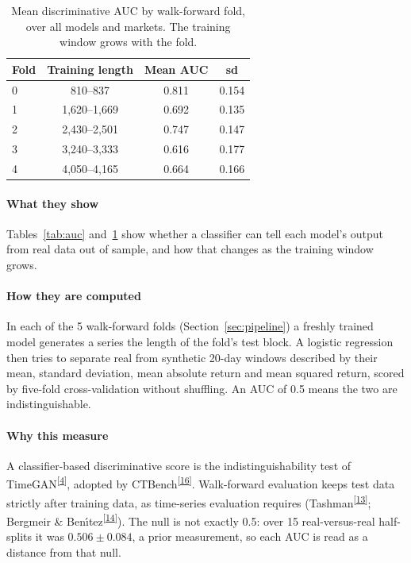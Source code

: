 \documentclass[11pt,a4paper]{article}
\makeatletter
\newcommand{\tcite}[1]{\textsuperscript{[\hyperlink{R:#1}{#1}]}}
\DeclareRobustCommand{\_}{\ifmmode\nfss@text{\textunderscore}\else\textunderscore\allowbreak\fi}
\makeatother
\begin{document}
\begin{table}[htbp]
\centering
\caption{Mean discriminative AUC by walk-forward fold, over all models and markets. The training window grows with the fold.}
\label{tab:folds}
\begin{tabular}{@{}lccc@{}}
\toprule
Fold & Training length & Mean AUC & sd \\
\midrule
0 & 810--837 & 0.811 & 0.154 \\
1 & 1,620--1,669 & 0.692 & 0.135 \\
2 & 2,430--2,501 & 0.747 & 0.147 \\
3 & 3,240--3,333 & 0.616 & 0.177 \\
4 & 4,050--4,165 & 0.664 & 0.166 \\
\bottomrule
\end{tabular}
\end{table}

\paragraph{What they show} Tables~\ref{tab:auc} and~\ref{tab:folds} show whether a classifier can tell each model's output from real data out of sample, and how that changes as the training window grows.

\paragraph{How they are computed} In each of the 5 walk-forward folds (Section~\ref{sec:pipeline}) a freshly trained model generates a series the length of the fold's test block. A logistic regression then tries to separate real from synthetic 20-day windows described by their mean, standard deviation, mean absolute return and mean squared return, scored by five-fold cross-validation without shuffling. An AUC of 0.5 means the two are indistinguishable.

\paragraph{Why this measure} A classifier-based discriminative score is the indistinguishability test of TimeGAN\tcite{4}, adopted by CTBench\tcite{16}. Walk-forward evaluation keeps test data strictly after training data, as time-series evaluation requires (Tashman\tcite{13}; Bergmeir \& Ben\'{\i}tez\tcite{14}). The null is not exactly 0.5: over 15 real-versus-real half-splits it was $0.506\pm0.084$, a prior measurement, so each AUC is read as a distance from that null.
\end{document}
